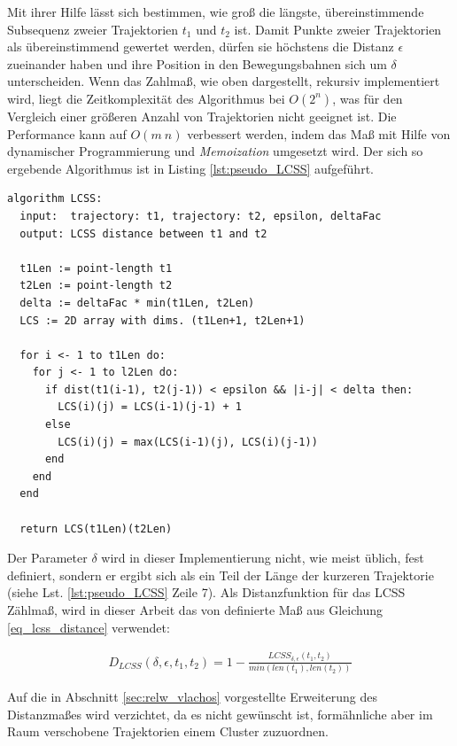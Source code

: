 Mit ihrer Hilfe lässt sich bestimmen, wie groß die längste, übereinstimmende Subsequenz zweier Trajektorien
$t_1$ und $t_2$ ist. Damit Punkte zweier Trajektorien als übereinstimmend gewertet werden, dürfen sie
höchstens die Distanz $\epsilon$ zueinander haben und ihre Position in den Bewegungsbahnen sich um $\delta$
unterscheiden.
Wenn das Zahlmaß, wie oben dargestellt, rekursiv implementiert wird, liegt die Zeitkomplexität des Algorithmus
bei $O(2^n)$, was für den Vergleich einer größeren Anzahl von Trajektorien nicht geeignet ist. Die Performance
kann auf $O(m\ n)$ verbessert werden, indem das Maß mit Hilfe von dynamischer Programmierung und \textit{Memoization}
umgesetzt wird. Der sich so ergebende Algorithmus ist in Listing \ref{lst:pseudo_LCSS} aufgeführt.
\begin{lstlisting}[caption=Pseudocode LCSS Bestimmung, language=Pseudo, label=lst:pseudo_LCSS] %TODO: evtl entfernen
algorithm LCSS:
  input:  trajectory: t1, trajectory: t2, epsilon, deltaFac
  output: LCSS distance between t1 and t2

  t1Len := point-length t1
  t2Len := point-length t2
  delta := deltaFac * min(t1Len, t2Len)
  LCS := 2D array with dims. (t1Len+1, t2Len+1)

  for i <- 1 to t1Len do:
    for j <- 1 to l2Len do:
      if dist(t1(i-1), t2(j-1)) < epsilon && |i-j| < delta then:
        LCS(i)(j) = LCS(i-1)(j-1) + 1
      else
        LCS(i)(j) = max(LCS(i-1)(j), LCS(i)(j-1))
      end
    end
  end

  return LCS(t1Len)(t2Len)
\end{lstlisting}

Der Parameter $\delta$ wird in dieser Implementierung nicht, wie meist üblich, fest definiert, sondern er ergibt sich als
ein Teil der Länge der kurzeren Trajektorie (siehe Lst. \ref{lst:pseudo_LCSS} Zeile 7).
Als Distanzfunktion für das LCSS Zählmaß, wird in dieser Arbeit das von \cite[]{Vlachos2002} definierte
Maß aus Gleichung \ref{eq_lcss_distance} verwendet:

\begin{ceqn}
\begin{align*}
    D_{LCSS}(\delta, \epsilon, t_1, t_2) = 1 - \frac{LCSS_{\delta, \epsilon}(t_1, t_2)}{min(len(t_1), len(t_2))}
\end{align*}
\end{ceqn}

Auf die in Abschnitt \ref{sec:relw_vlachos} vorgestellte Erweiterung des Distanzmaßes wird verzichtet,
da es nicht gewünscht ist, formähnliche aber im Raum verschobene Trajektorien einem Cluster zuzuordnen.

